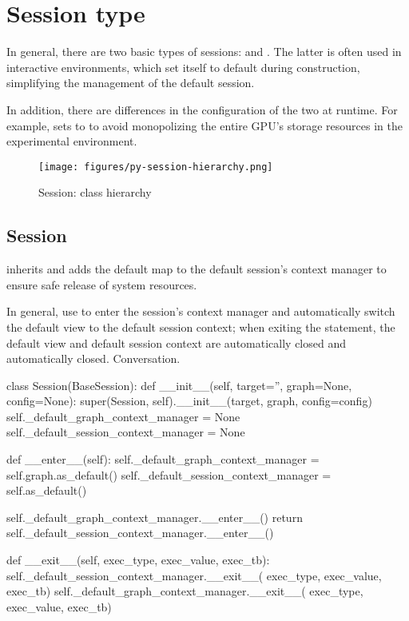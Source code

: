 \section{Session type}
\begin{content}
In general, there are two basic types of sessions:  and . The latter is often used in interactive environments, which set itself to default during construction, simplifying the management of the default session.

In addition, there are differences in the configuration of the two at runtime. For example,  sets  to  to avoid monopolizing the entire GPU's storage resources in the experimental environment.

\begin{figure}[!htbp]
  \centering
  \texttt{[image: figures/py-session-hierarchy.png]}
  \caption{Session: class hierarchy}
  \label{fig:py-session-hierarchy}
\end{figure}


\subsection{Session}
 inherits  and adds the default map to the default session's context manager to ensure safe release of system resources.

In general, use  to enter the session's context manager and automatically switch the default view to the default session context; when exiting the  statement, the default view and default session context are automatically closed and automatically closed. Conversation.

\begin{leftbar}
\begin{python}
class Session(BaseSession):
  def __init__(self, target='', graph=None, config=None):
    super(Session, self).__init__(target, graph, config=config)
    self._default_graph_context_manager = None
    self._default_session_context_manager = None

  def __enter__(self):
    self._default_graph_context_manager = self.graph.as_default()
    self._default_session_context_manager = self.as_default()

    self._default_graph_context_manager.__enter__()
    return self._default_session_context_manager.__enter__()

  def __exit__(self, exec_type, exec_value, exec_tb):
    self._default_session_context_manager.__exit__(
        exec_type, exec_value, exec_tb)
    self._default_graph_context_manager.__exit__(
        exec_type, exec_value, exec_tb)


\end{python}
\end{leftbar}
\end{content}
